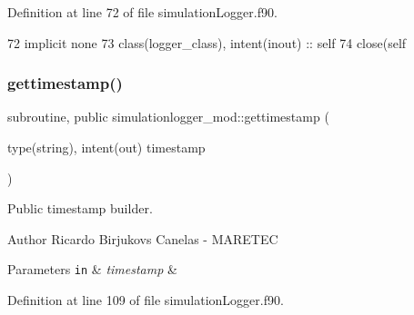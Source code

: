 Definition at line 72 of file simulation\+Logger.\+f90.


\begin{DoxyCode}
72     \textcolor{keywordtype}{implicit none}
73     \textcolor{keywordtype}{class}(logger\_class), \textcolor{keywordtype}{intent(inout)} :: self
74     \textcolor{keyword}{close}(self%
\end{DoxyCode}
\mbox{\label{namespacesimulationlogger__mod_abff1db7e1655cb59097146d78e650672}} 
\subsubsection{\texorpdfstring{gettimestamp()}{gettimestamp()}}
{\footnotesize\ttfamily subroutine, public simulationlogger\+\_\+mod\+::gettimestamp (\begin{DoxyParamCaption}\item[{type(string), intent(out)}]{timestamp }\end{DoxyParamCaption})}



Public timestamp builder. 

\begin{DoxyAuthor}{Author}
Ricardo Birjukovs Canelas -\/ M\+A\+R\+E\+T\+EC 
\end{DoxyAuthor}

\begin{DoxyParams}[1]{Parameters}
\mbox{\tt in}  & {\em timestamp} & \\
\hline
\end{DoxyParams}


Definition at line 109 of file simulation\+Logger.\+f90.


